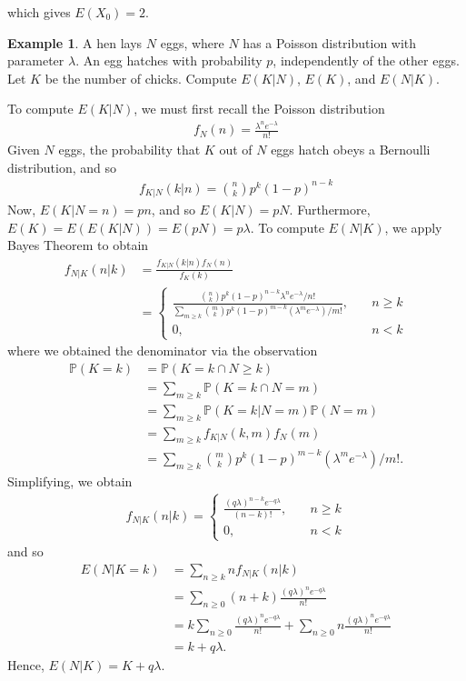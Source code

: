 \documentclass[12pt]{article}
\newcommand{\prob}{\mathbb{P}}
\theoremstyle{plain}
\theoremstyle{definition}
\newtheorem*{example}{Example}
\theoremstyle{remark}
\numberwithin{equation}{section}  %
\begin{document}
which gives $E(X_0) = 2$.
\begin{example}
	A hen lays $N$ eggs, where $N$ has a Poisson distribution with parameter
	$\lambda$. An egg hatches with probability $p$, independently  of the other
	eggs. Let $K$ be the number of chicks. Compute $E(K|N)$, $E(K)$, and $E(N | 
	K)$.
\end{example}
To compute $E(K|N)$, we must first recall the Poisson distribution
\begin{align*}
	f_N(n) = \frac{\lambda^n e^{-\lambda}}{n!}
\end{align*}
Given $N$ eggs, the probability that $K$ out of $N$ eggs hatch obeys a 
Bernoulli distribution, and so 
\begin{align*}
	f_{K|N}(k|n) = \binom{n}{k} p^k {(1-p)}^{n-k}
\end{align*}
Now, $E(K | N = n) = pn$, and so $E(K | N) = pN$. Furthermore, $E(K) = E(E(K
| N	)) = E(pN) = p \lambda$.
To compute $E(N | K)$, we apply Bayes Theorem to obtain
\begin{align*}
	f_{N|K}(n|k) & = \frac{f_{K|N}(k|n)f_N(n)}{f_K(k)}
	\\
	& = \begin{cases}
		\frac{\binom{n}{k}p^k {(1-p)}^{n-k} \lambda^n
			e^{-\lambda}/n!}{\sum_{m \ge k}
			\binom{m}{k} p^k {(1 - p)}^{m-k} (\lambda^m e^{-\lambda})/m!}
		, \quad & n \ge k
		\\
		0, \quad & n<k
	\end{cases}
\end{align*}
where we obtained the denominator via the observation
\begin{align*}
	\prob(K = k) & = \prob(K = k \cap N \ge k) 
	\\
	& = \sum_{m \ge k} \prob(K =
	k \cap N = m) 
	\\
	& = \sum_{m \ge k} \prob(K = k | N = m) \prob(N = m)
	\\
	& = \sum_{m \ge k} f_{K|N}(k, m) f_N(m)
	\\
	& = \sum_{m \ge k}
	\binom{m}{k} p^k {(1 - p)}^{m-k} (\lambda^m e^{-\lambda})/m!.
\end{align*}
Simplifying, we obtain
\begin{align*}
	f_{N|K}(n|k) = 
	\begin{cases}
		\frac{{(q\lambda)}^{n-k} e^{-q\lambda}}{(n-k)!}, \quad & n \ge k
		\\
		0, \quad & n<k
	\end{cases}
\end{align*}
and so 
\begin{align*}
	E(N | K = k) & = \sum_{n \ge k} n f_{N|K}(n | k)
	\\
	& = \sum_{n \ge 0} (n + k) \frac{{(q \lambda)}^n e^{-q\lambda}}{n!}
	\\
	& = k \sum_{n \ge 0} \frac{{(q \lambda)}^n e^{-q\lambda}}{n!} + \sum_{n \ge 
		0}
	n \frac{{(q\lambda)}^n e^{-q\lambda}}{n!} 
	\\
	& = k + q\lambda.
\end{align*}
Hence, $E(N|K) = K + q \lambda$.
\end{document}
